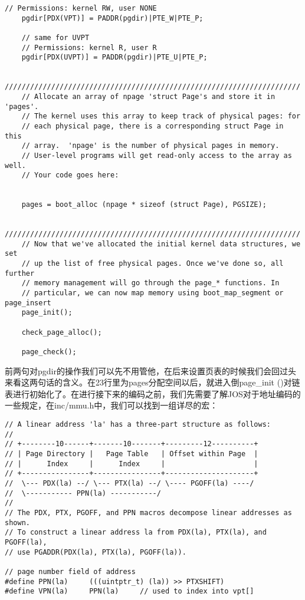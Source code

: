\documentclass{article}
\newcommand{\funcname}[1]{{\ttfamily \small #1}}
\begin{document}
\begin{CJK*}{UTF8}{gkai}
\begin{lstlisting}[style=ccode, title={\scriptsize \ttfamily \bfseries kern/pmap.c: i386\_vm\_init ()}]
	// Permissions: kernel RW, user NONE
	pgdir[PDX(VPT)] = PADDR(pgdir)|PTE_W|PTE_P;

	// same for UVPT
	// Permissions: kernel R, user R 
	pgdir[PDX(UVPT)] = PADDR(pgdir)|PTE_U|PTE_P;

	//////////////////////////////////////////////////////////////////////
	// Allocate an array of npage 'struct Page's and store it in 'pages'.
	// The kernel uses this array to keep track of physical pages: for
	// each physical page, there is a corresponding struct Page in this
	// array.  'npage' is the number of physical pages in memory.
	// User-level programs will get read-only access to the array as well.
	// Your code goes here:
	

	pages = boot_alloc (npage * sizeof (struct Page), PGSIZE);

	//////////////////////////////////////////////////////////////////////
	// Now that we've allocated the initial kernel data structures, we set
	// up the list of free physical pages. Once we've done so, all further
	// memory management will go through the page_* functions. In
	// particular, we can now map memory using boot_map_segment or page_insert
	page_init();

	check_page_alloc();

	page_check();
\end{lstlisting}

前两句对pgdir的操作我们可以先不用管他，在后来设置页表的时候我们会回过头来看这两句话的含义。在23行里为pages分配空间以后，就进入倒\funcname{page\_init ()}对链表进行初始化了。在进行接下来的编码之前，我们先需要了解JOS对于地址编码的一些规定，在inc/mmu.h中，我们可以找到一组详尽的宏：

\begin{lstlisting}[style=ccode, firstnumber=16, title={\scriptsize \ttfamily \bfseries inc/mmu.h}]
// A linear address 'la' has a three-part structure as follows:
//
// +--------10------+-------10-------+---------12----------+
// | Page Directory |   Page Table   | Offset within Page  |
// |      Index     |      Index     |                     |
// +----------------+----------------+---------------------+
//  \--- PDX(la) --/ \--- PTX(la) --/ \---- PGOFF(la) ----/
//  \----------- PPN(la) -----------/
//
// The PDX, PTX, PGOFF, and PPN macros decompose linear addresses as shown.
// To construct a linear address la from PDX(la), PTX(la), and PGOFF(la),
// use PGADDR(PDX(la), PTX(la), PGOFF(la)).

// page number field of address
#define PPN(la)		(((uintptr_t) (la)) >> PTXSHIFT)
#define VPN(la)		PPN(la)		// used to index into vpt[]


\end{lstlisting}
\end{CJK*}
\end{document}
